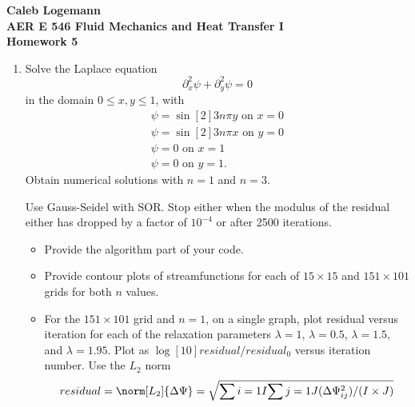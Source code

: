 \documentclass[11pt, oneside]{article}
\begin{document}
\noindent \textbf{\Large{Caleb Logemann \\
AER E 546 Fluid Mechanics and Heat Transfer I \\
Homework 5
}}

%
\begin{enumerate}
  \item %
    Solve the Laplace equation
    \[
      \partial^2_x \psi + \partial^2_y \psi = 0
    \]
    in the domain $0 \le x, y \le 1$, with
    \begin{gather*}
      \psi = \sin[2]{3n\pi y} \text{ on } x = 0 \\
      \psi = \sin[2]{3n\pi x} \text{ on } y = 0 \\
      \psi = 0 \text{ on } x = 1  \\
      \psi = 0 \text{ on } y = 1.
    \end{gather*}
    Obtain numerical solutions with $n = 1$ and $n = 3$.

    Use Gauss-Seidel with SOR.
    Stop either when the modulus of the residual either has dropped by a factor
    of $10^{-4}$ or after 2500 iterations.
    \begin{itemize}
      \item Provide the algorithm part of your code.
      \item Provide contour plots of streamfunctions for each of $15 \times 15$
        and $151 \times 101$ grids for both $n$ values.
      \item For the $151 \times 101$ grid and $n = 1$, on a single graph, plot
        residual versus iteration for each of the relaxation parameters
        $\lambda = 1$, $\lambda = 0.5$, $\lambda = 1.5$, and $\lambda = 1.95$.
        Plot as $\log[10]{residual/residual_0}$ versus iteration number.
        Use the $L_2$ norm
        \[
          residual = \norm[L_2]{\Delta \Psi} = \sqrt{\sum{i = 1}{I}{\sum{j = 1}{J}{(\Delta \Psi_{ij}^2)/(I \times J)}}}
        \]
    \end{itemize}


\end{enumerate}
\end{document}

